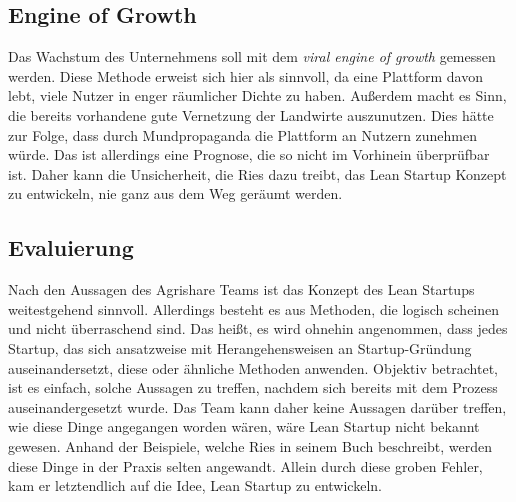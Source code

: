 \subsection*{\label{sec:LeanStartup-Umsetzung-EngineOfGrowth}\thesubsection\quad Engine of Growth}Das Wachstum des Unternehmens soll mit dem \textit{viral engine of growth} gemessen werden. Diese Methode erweist sich hier als sinnvoll, da eine Plattform davon lebt, viele Nutzer in enger räumlicher Dichte zu haben. Außerdem macht es Sinn, die bereits vorhandene gute Vernetzung der Landwirte auszunutzen. Dies hätte zur Folge, dass durch Mundpropaganda die Plattform an Nutzern zunehmen würde. Das ist allerdings eine Prognose, die so nicht im Vorhinein überprüfbar ist. Daher kann die Unsicherheit, die Ries dazu treibt, das Lean Startup Konzept zu entwickeln, nie ganz aus dem Weg geräumt werden.

\subsection*{\label{sec:LeanStartup-Umsetzung-Evaluierung}\thesubsection\quad Evaluierung}Nach den Aussagen des Agrishare Teams ist das Konzept des Lean Startups weitestgehend sinnvoll. Allerdings besteht es aus Methoden, die logisch scheinen und nicht überraschend sind. Das heißt, es wird ohnehin angenommen, dass jedes Startup, das sich ansatzweise mit Herangehensweisen an Startup-Gründung auseinandersetzt, diese oder ähnliche Methoden anwenden. Objektiv betrachtet, ist es einfach, solche Aussagen zu treffen, nachdem sich bereits mit dem Prozess auseinandergesetzt wurde. Das Team kann daher keine Aussagen darüber treffen, wie diese Dinge angegangen worden wären, wäre Lean Startup nicht bekannt gewesen. Anhand der Beispiele, welche Ries in seinem Buch beschreibt, werden diese Dinge in der Praxis selten angewandt. Allein durch diese groben Fehler, kam er letztendlich auf die Idee, Lean Startup zu entwickeln.



